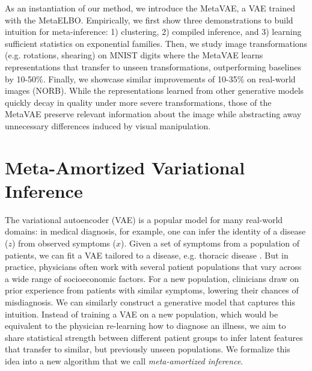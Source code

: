 As an instantiation of our method, we introduce the MetaVAE, a VAE trained with the MetaELBO. 
Empirically, we first show three demonstrations to build intuition for meta-inference: 1) clustering, 2) compiled inference, and 3) learning sufficient statistics on exponential families. Then, we study image transformations (e.g. rotations, shearing) on MNIST digits where the MetaVAE learns representations that transfer to unseen transformations, outperforming baselines by 10-50\%. Finally, we showcase similar improvements of 10-35\% on real-world images (NORB).
While the representations learned from other generative models quickly decay in quality under more severe transformations, those of the MetaVAE preserve relevant information about the image while abstracting away unnecessary differences induced by visual manipulation. 

\section{Meta-Amortized Variational Inference}
\label{sec:meta}


The variational autoencoder (VAE) is a popular model for many real-world domains: in medical diagnosis, for example, one can infer the identity of a disease ($z$) from observed symptoms ($x$). Given a set of symptoms from a population of patients, we can fit a VAE tailored to a disease, e.g. thoracic disease \cite{mao2018deep}.
But in practice, physicians often work with several patient populations that vary across a wide range of socioeconomic factors. For a new population, clinicians draw on prior experience from patients with similar symptoms, lowering their chances of misdiagnosis. 
We can similarly construct a generative model that captures this intuition. 
Instead of training a VAE on a new population, which would be equivalent to the physician re-learning how to diagnose an illness, we aim to share statistical strength between different patient groups to infer latent features that transfer to similar, but previously unseen populations.
We formalize this idea into a new algorithm that we call \textit{meta-amortized inference}.

